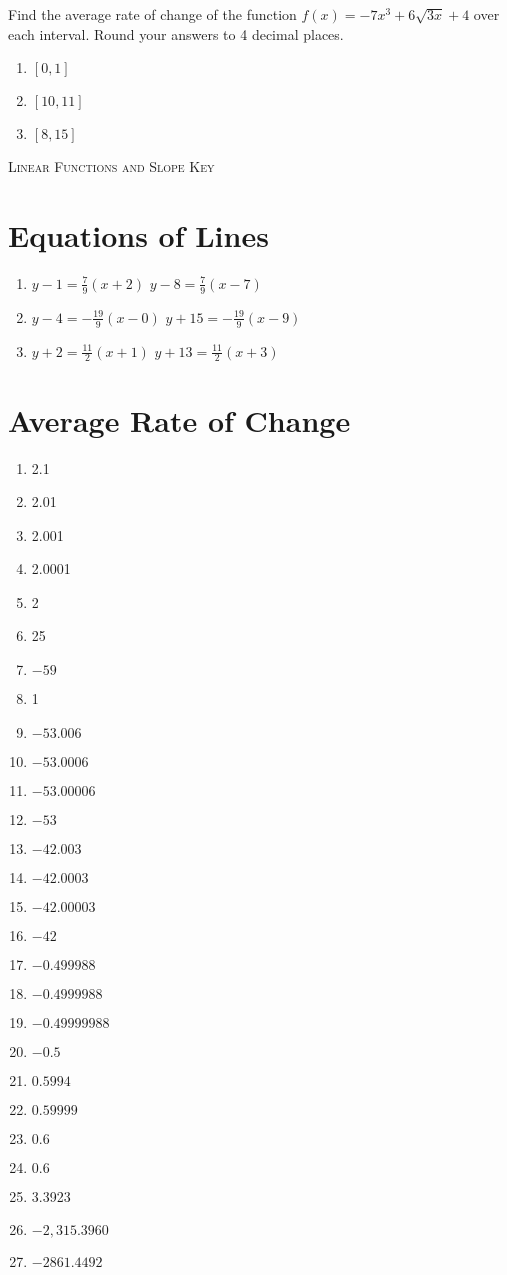 Find the average rate of change of the function $f(x) = -7x^3 + 6\sqrt{3x} + 4$ over each interval. Round your answers to 4 decimal places.
\begin{enumerate}	\setcounter{enumi}{\value{Review}}
	\item $[0,1]$
	\item $[10,11]$
	\item $[8,15]$
\end{enumerate}	\setcounter{Review}{\value{enumi}}

\newpage

\textsc{Linear Functions and Slope Key}

\section*{Equations of Lines}
\begin{enumerate}
\item $y-1 = \frac{7}{9}(x+2)$  $y-8=\frac{7}{9}(x-7)$
    \item $y-4 = -\frac{19}{9}(x-0)$  $y+15=-\frac{19}{9}(x-9)$
    \item $y+2 = \frac{11}{2}(x+1)$  $y+13=\frac{11}{2}(x+3)$
\end{enumerate}

\section*{Average Rate of Change}
\begin{enumerate}
\item 2.1
\item 2.01
\item 2.001
\item 2.0001
\item 2
\item 25
\item $-59$
\item 1
\item $-53.006$
\item $-53.0006$
\item $-53.00006$
\item $-53$
\item $-42.003$
\item $-42.0003$
\item $-42.00003$
\item $-42$
\item $-0.499988$
\item $-0.4999988$
\item $-0.49999988$
\item $-0.5$
\item $0.5994$
\item $0.59999$
\item $0.6$
\item $0.6$
\item 3.3923
\item $-2,315.3960$
\item $-2861.4492$
\end{enumerate}